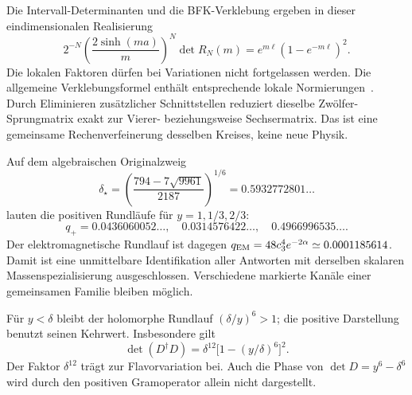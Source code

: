 Die Intervall-Determinanten und die BFK-Verklebung ergeben in dieser eindimensionalen Realisierung
\begin{equation}
2^{-N}\left(\frac{2\sinh(ma)}m\right)^N\det R_N(m)
=e^{m\ell}(1-e^{-m\ell})^2.
\end{equation}
Die lokalen Faktoren dürfen bei Variationen nicht fortgelassen werden. Die allgemeine Verklebungsformel enthält entsprechende lokale Normierungen~\cite{bfkoriginal,leebfk}. Durch Eliminieren zusätzlicher Schnittstellen reduziert dieselbe Zwölfer-Sprungmatrix exakt zur Vierer- beziehungsweise Sechsermatrix. Das ist eine gemeinsame Rechenverfeinerung desselben Kreises, keine neue Physik.

Auf dem algebraischen Originalzweig
\begin{equation}
\delta_\star=\left(\frac{794-7\sqrt{9961}}{2187}\right)^{1/6}
=0.5932772801\ldots
\end{equation}
lauten die positiven Rundläufe für $y=1,1/3,2/3$:
\begin{equation}
q_+=0.0436060052\ldots,\quad0.0314576422\ldots,\quad0.4966996535\ldots .
\end{equation}
Der elektromagnetische Rundlauf ist dagegen $q_{\rm EM}=48c_3^4e^{-2\alpha}\simeq0.0001185614$. Damit ist eine unmittelbare Identifikation aller Antworten mit derselben skalaren Massenspezialisierung ausgeschlossen. Verschiedene markierte Kanäle einer gemeinsamen Familie bleiben möglich.

Für $y<\delta$ bleibt der holomorphe Rundlauf $(\delta/y)^6>1$; die positive Darstellung benutzt seinen Kehrwert. Insbesondere gilt
\begin{equation}
\det(D^\dagger D)=\delta^{12}\bigl[1-(y/\delta)^6\bigr]^2.
\end{equation}
Der Faktor $\delta^{12}$ trägt zur Flavorvariation bei. Auch die Phase von $\det D=y^6-\delta^6$ wird durch den positiven Gramoperator allein nicht dargestellt.

